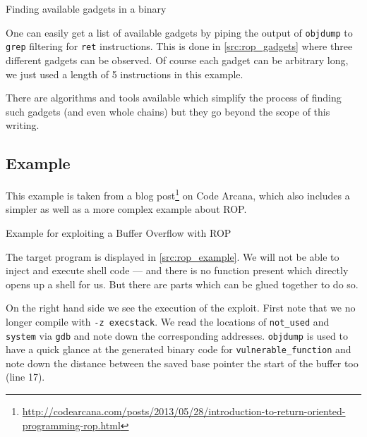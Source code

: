 \documentclass[article]{uibk}
\begin{document}
\begin{listing}[h!]
    \caption{Finding available gadgets in a binary}
    \label{src:rop_gadgets}
\end{listing}

One can easily get a list of available gadgets by piping the output of
\texttt{objdump} to \texttt{grep} filtering for \texttt{ret} instructions. This
is done in \cref{src:rop_gadgets} where three different gadgets can be
observed. Of course each gadget can be arbitrary long, we just used a length of
5 instructions in this example.

There are algorithms and tools available which simplify the process of finding
such gadgets (and even whole chains) but they go beyond the scope of this
writing.~\cite{shacham2007}

\subsection{Example}

This example is taken from a blog
post\footnote{\url{http://codearcana.com/posts/2013/05/28/introduction-to-return-oriented-programming-rop.html}}
on Code Arcana, which also includes a simpler as well as a more complex example
about ROP.

\begin{listing}[h!]
    \begin{minipage}[t]{0.4\textwidth}
    \end{minipage}\hfill
    \begin{minipage}[t]{0.6\textwidth}
    \end{minipage}
    \caption{Example for exploiting a Buffer Overflow with ROP}
    \label{src:rop_example}
\end{listing}

The target program is displayed in \cref{src:rop_example}. We will not be able
to inject and execute shell code --- and there is no function present which
directly opens up a shell for us. But there are parts which can be glued
together to do so.

On the right hand side we see the execution of the exploit. First note that we
no longer compile with \texttt{-z execstack}. We read the locations of
\texttt{not\_used} and \texttt{system} via \texttt{gdb} and note down the
corresponding addresses. \texttt{objdump} is used to have a quick glance at the
generated binary code for \texttt{vulnerable\_function} and note down the
distance between the saved base pointer the start of the buffer too (line 17).
\end{document}
